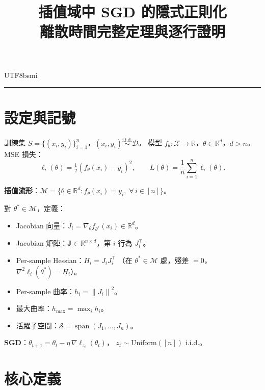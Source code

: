 \documentclass[11pt,a4paper]{article}
\theoremstyle{definition}
\DeclareMathOperator{\spn}{span}
\newcommand{\R}{\mathbb{R}}
\newcommand{\cM}{\mathcal{M}}
\newcommand{\cS}{\mathcal{S}}
\newcommand{\cX}{\mathcal{X}}
\newcommand{\cD}{\mathcal{D}}
\newcommand{\bJ}{\mathbf{J}}
\newcommand{\norm}[1]{\left\|#1\right\|}
\begin{document}
\begin{CJK}{UTF8}{bsmi}

\title{\Large 插值域中 SGD 的隱式正則化\\[4pt]
  \large 離散時間完整定理與逐行證明}
\author{}
\date{}
\maketitle

\tableofcontents
\bigskip\hrule\bigskip

\section{設定與記號}

訓練集 $S = \{(x_i, y_i)\}_{i=1}^n$，$(x_i,y_i)\stackrel{\text{i.i.d.}}{\sim}\cD$。
模型 $f_\theta:\cX\to\R$，$\theta\in\R^d$，$d > n$。
MSE 損失：
\[
  \ell_i(\theta)=\tfrac{1}{2}(f_\theta(x_i)-y_i)^2,\qquad
  L(\theta)=\frac{1}{n}\sum_{i=1}^n\ell_i(\theta).
\]

\textbf{插值流形}：$\cM=\{\theta\in\R^d:f_\theta(x_i)=y_i,\;\forall\,i\in[n]\}$。

對 $\theta^*\in\cM$，定義：
\begin{itemize}
  \item Jacobian 向量：$J_i=\nabla_\theta f_{\theta^*}(x_i)\in\R^d$。
  \item Jacobian 矩陣：$\bJ\in\R^{n\times d}$，第 $i$ 行為 $J_i^\top$。
  \item Per-sample Hessian：$H_i=J_iJ_i^\top$
    （在 $\theta^*\in\cM$ 處，殘差 $=0$，$\nabla^2\ell_i(\theta^*)=H_i$）。
  \item Per-sample 曲率：$h_i=\norm{J_i}^2$。
  \item 最大曲率：$h_{\max}=\max_i h_i$。
  \item 活躍子空間：$\cS=\spn(J_1,\ldots,J_n)$。
\end{itemize}

\textbf{SGD}：$\theta_{t+1}=\theta_t-\eta\,\nabla\ell_{z_t}(\theta_t)$，
$z_t\sim\mathrm{Uniform}([n])$ i.i.d.。

\section{核心定義}


\end{CJK}
\end{document}
